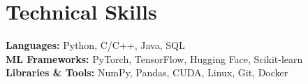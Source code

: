 \documentclass[10pt,letterpaper]{article}
\newcommand{\headingsimple}[2]{%
  \noindent\textbf{#1} \hfill #2\par
}
\begin{document}



\section{Technical Skills}
\textbf{Languages:} Python, C/C++, Java, SQL\\
\textbf{ML Frameworks:} PyTorch, TensorFlow, Hugging Face, Scikit-learn\\
\textbf{Libraries \& Tools:} NumPy, Pandas, CUDA, Linux, Git, Docker
\end{document}
